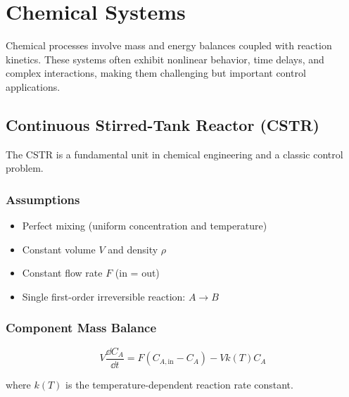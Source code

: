 
\section{Chemical Systems}
\label{sec:chemical}

Chemical processes involve mass and energy balances coupled with reaction kinetics. These systems often exhibit nonlinear behavior, time delays, and complex interactions, making them challenging but important control applications.

\subsection{Continuous Stirred-Tank Reactor (CSTR)}
\label{subsec:cstr}

The CSTR is a fundamental unit in chemical engineering and a classic control problem.



\subsubsection{Assumptions}

\begin{itemize}
    \item Perfect mixing (uniform concentration and temperature)
    \item Constant volume $V$ and density $\rho$
    \item Constant flow rate $F$ (in = out)
    \item Single first-order irreversible reaction: $A \to B$
\end{itemize}

\subsubsection{Component Mass Balance}

\begin{equation}
V\frac{\dd C_A}{\dd t} = F(C_{A,\text{in}} - C_A) - Vk(T)C_A
\end{equation}

where $k(T)$ is the temperature-dependent reaction rate constant.

